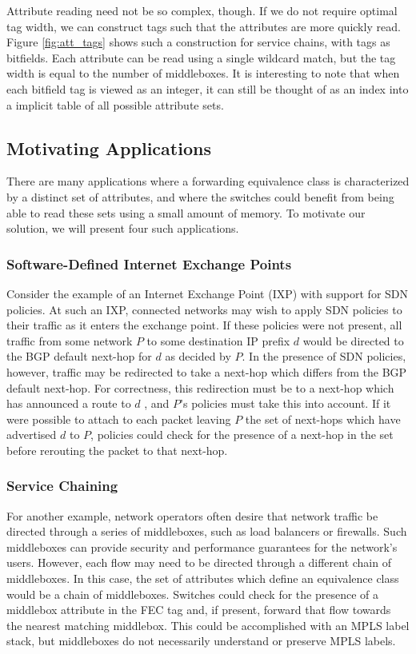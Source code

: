 Attribute reading need not be so complex, though. If we do not require optimal tag width, we can construct tags such that the attributes are more quickly read. Figure \ref{fig:att_tags} shows such a construction for service chains, with tags as bitfields. Each attribute can be read using a single wildcard match, but the tag width is equal to the number of middleboxes. It is interesting to note that when each bitfield tag is viewed as an integer, it can still be thought of as an index into a implicit table of all possible attribute sets. 


\subsection{Motivating Applications}
There are many applications where a forwarding equivalence class is characterized by a distinct set of attributes, and where the switches could benefit from being able to read these sets using a small amount of memory. To motivate our solution, we will present four such applications. 

\subsubsection{Software-Defined Internet Exchange Points}
Consider the example of an Internet Exchange Point (IXP) with support for SDN policies. At such an IXP, connected networks may wish to apply SDN policies to their traffic as it enters the exchange point. If these policies were not present, all traffic from some network $P$  to some destination IP prefix $d$ would be directed to the BGP default next-hop for $d$ as decided by $P$. In the presence of SDN policies, however, traffic may be redirected to take a next-hop which differs from the BGP default next-hop. For correctness, this redirection must be to a next-hop which has announced a route to $d$ , and $P$'s policies must take this into account. If it were possible to attach to each packet leaving $P$ the set of next-hops which have advertised $d$ to $P$, policies could check for the presence of a next-hop in the set before rerouting the packet to that next-hop. 

\subsubsection{Service Chaining}
For another example, network operators often desire that network traffic be directed through a series of middleboxes, such as load balancers or firewalls. Such middleboxes can provide security and performance guarantees for the network's users. However, each flow may need to be directed through a different chain of middleboxes. In this case, the set of attributes which define an equivalence class would be a chain of middleboxes. Switches could check for the presence of a middlebox attribute in the FEC tag and, if present, forward that flow towards the nearest matching middlebox. This could be accomplished with an MPLS label stack, but middleboxes do not necessarily understand or preserve MPLS labels. 

